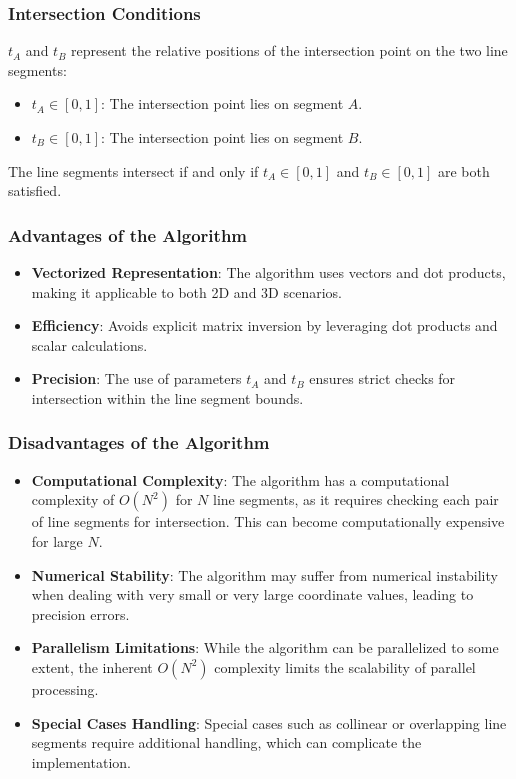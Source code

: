 \documentclass[a4paper]{article}
\begin{document}
\begin{sloppypar}
\subsubsection{Intersection Conditions}

\(t_A\) and \(t_B\) represent the relative positions of the intersection point on the two line segments:
\begin{itemize}
  \item \(t_A \in [0, 1]\): The intersection point lies on segment \(A\).
  \item \(t_B \in [0, 1]\): The intersection point lies on segment \(B\).
\end{itemize}

The line segments intersect if and only if \(t_A \in [0, 1]\) and \(t_B \in [0, 1]\) are both satisfied.

\subsubsection{Advantages of the Algorithm}

\begin{itemize}
  \item \textbf{Vectorized Representation}: The algorithm uses vectors and dot products, making it applicable to both 2D and 3D scenarios.
  \item \textbf{Efficiency}: Avoids explicit matrix inversion by leveraging dot products and scalar calculations.
  \item \textbf{Precision}: The use of parameters \(t_A\) and \(t_B\) ensures strict checks for intersection within the line segment bounds.
\end{itemize}

\subsubsection{Disadvantages of the Algorithm}
\begin{itemize}
  \item \textbf{Computational Complexity}: The algorithm has a computational complexity of \(O(N^2)\) for \(N\) line segments, as it requires checking each pair of line segments for intersection. This can become computationally expensive for large \(N\).
  \item \textbf{Numerical Stability}: The algorithm may suffer from numerical instability when dealing with very small or very large coordinate values, leading to precision errors.
  \item \textbf{Parallelism Limitations}: While the algorithm can be parallelized to some extent, the inherent \(O(N^2)\) complexity limits the scalability of parallel processing.
  \item \textbf{Special Cases Handling}: Special cases such as collinear or overlapping line segments require additional handling, which can complicate the implementation.
\end{itemize}

\end{sloppypar}
\end{document}
